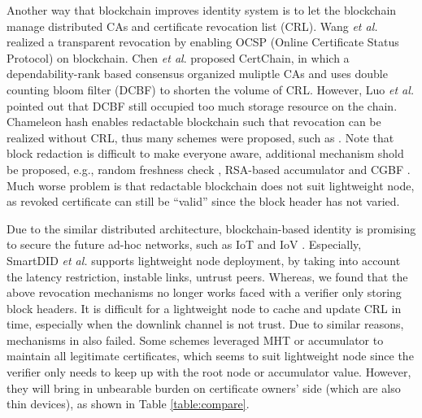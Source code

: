 \documentclass[conference]{IEEEtran}
\begin{document}
Another way that blockchain improves identity system is to let the blockchain manage distributed CAs and certificate revocation list (CRL). Wang \textit{et al.} \cite{CTRT} realized a transparent revocation by enabling OCSP (Online Certificate Status Protocol) on blockchain.
Chen \textit{et al}. \cite{chenCertchainPublicEfficient2018a} proposed CertChain, in which a dependability-rank based consensus organized muliptle CAs and uses double counting bloom filter (DCBF) to shorten the volume of CRL. However, Luo \textit{et al.} \cite{luoScalaCertScalabilityOrientedPKI2022a} pointed out that DCBF still occupied too much storage resource on the chain. Chameleon hash \cite{ateniese2017redactable} enables redactable blockchain such that revocation can be realized without CRL, thus many schemes were proposed, such as \cite{luoScalaCertScalabilityOrientedPKI2022a,jiaRedactableBlockchainDecentralized2022, xu2021k, jia2021process}. Note that block redaction is difficult to make everyone aware, additional mechanism shold be proposed, e.g., random freshness check \cite{luoScalaCertScalabilityOrientedPKI2022a}, RSA-based accumulator \cite{jiaRedactableBlockchainDecentralized2022} and CGBF \cite{jia2021process}. Much worse problem is that redactable blockchain does not suit lightweight node, as revoked certificate can still be ``valid'' since the block header has not varied.

Due to the similar distributed architecture, blockchain-based identity is promising to secure the future ad-hoc networks, such as IoT and IoV \cite{cui2022efficient, singh2018branch, smartdid, yu2019blockchain}. Especially, SmartDID \textit{et al.} \cite{smartdid} supports lightweight node deployment, by taking into account the latency restriction, instable links, untrust peers. Whereas, we found that the above revocation mechanisms no longer works faced with a verifier only storing block headers. It is difficult for a lightweight node to cache and update CRL in time, especially when the downlink channel is not trust. Due to similar reasons, mechanisms in \cite{luoScalaCertScalabilityOrientedPKI2022a, jiaRedactableBlockchainDecentralized2022} also failed. Some schemes leveraged MHT \cite{certledger} or accumulator \cite{yu2019blockchain} to maintain all legitimate certificates, which seems to suit lightweight node since the verifier only needs to keep up with the root node or accumulator value. 
However, they will bring in unbearable burden on certificate owners' side (which are also thin devices), as shown in Table \ref{table:compare}. 
\end{document}
